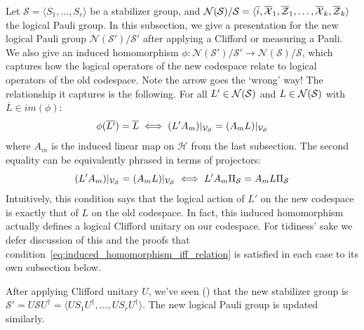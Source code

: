 Let $\mathcal{S} = \langle S_1, \ldots, S_r \rangle$ be a stabilizer group, and $\mathcal{N}(\mathcal{S})/\mathcal{S} = \langle \overline{i}, \overline{\mathcal{X}}_1, \overline{\mathcal{Z}}_1, \ldots, \overline{\mathcal{X}}_k, \overline{\mathcal{Z}}_k \rangle $ the logical Pauli group.
In this subsection, we give a presentation for the new logical Pauli group $\mathcal{N}(\mathcal{S}')/\mathcal{S}'$ after applying a Clifford or measuring a Pauli.
We also give an induced homomorphism $\phi: \mathcal{N}(\mathcal{S}')/\mathcal{S}' \to \mathcal{N}(\mathcal{S})/\mathcal{S}$, which captures how the logical operators of the new codespace relate to logical operators of the old codespace.
Note the arrow goes the `wrong' way!
The relationship it captures is the following.
For all $L' \in \mathcal{N}(\mathcal{S})$ and $L \in \mathcal{N}(\mathcal{S})$ with $\overline{L} \in im(\phi)$:
\begin{equation}\label{eq:induced_homomorphism_iff_relation}
    \phi(\overline{L'}) = \overline{L} \iff (L' A_m)|_{\mathcal{V}_{\mathcal{S}}} = (A_m L)|_{\mathcal{V}_{\mathcal{S}}}
\end{equation}
where $A_m$ is the induced linear map on $\mathcal{H}$ from the last subsection.
The second equality can be equivalently phrased in terms of projectors:
\begin{equation}\label{eq:induced_homomorphism_iff_relation_via_projector}
    (L' A_m)|_{\mathcal{V}_{\mathcal{S}}} = (A_m L)|_{\mathcal{V}_{\mathcal{S}}} \iff L' A_m \Pi_{\mathcal{S}} = A_m L \Pi_{\mathcal{S}}
\end{equation}
Intuitively, this condition says that the logical action of $L'$ on the new codespace is exactly that of $L$ on the old codespace.
In fact, this induced homomorphism actually defines a logical Clifford unitary on our codespace.
For tidiness' sake we defer discussion of this and the proofs that condition~\eqref{eq:induced_homomorphism_iff_relation} is satisfied in each case to its own subsection below.

After applying Clifford unitary $U$, we've seen () that the new stabilizer group is $\mathcal{S}' = U\mathcal{S}U^\dagger = \langle U S_1 U^\dagger, \ldots, U S_r U^\dagger \rangle$.
The new logical Pauli group is updated similarly.

